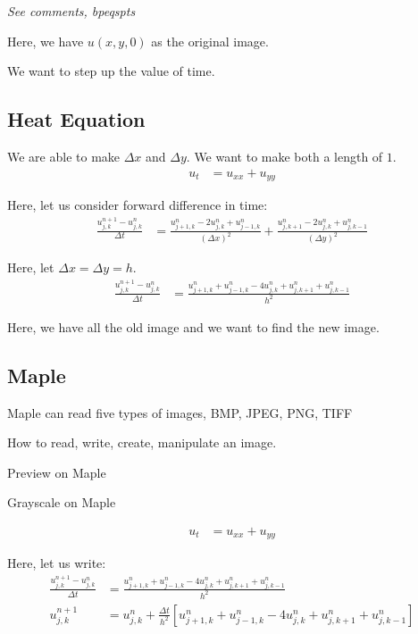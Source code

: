 \emph{See comments, bpeqspts}

Here, we have $u(x, y, 0)$ as the original image.

We want to step up the value of time.


\subsection{Heat Equation}

We are able to make $\Delta x$ and $\Delta y$. We want to make both a length of $1$.
%
\begin{align}
  u_t & = u_{xx} + u_{yy}
\end{align}

Here, let us consider forward difference in time:
%
\begin{align}
  \frac
  {u^{n + 1}_{j, k} - u^n_{j, k}}
  {\Delta t}
  & =
  \frac
  {
  u^n_{j+1, k} - 2u^n_{j, k} + u^n_{j - 1, k}
  }
  {
  (\Delta x)^2
  }
  +
  \frac
  {
  u^n_{j, k+1} - 2u^n_{j, k} + u^n_{j, k - 1}
  }
  {
  (\Delta y)^2
  }
\end{align}

Here, let $\Delta x = \Delta y = h$.
%
\begin{align}
  \frac
  {u^{n + 1}_{j, k} - u^n_{j, k}}
  {\Delta t}
  & = \frac
  {
  u^n_{j+1, k} + u^n_{j-1, k} - 4u^n_{j, k} + u^n_{j, k+1} + u^n_{j, k-1}
  }
  {h^2}
\end{align}

Here, we have all the old image and we want to find the new image.


\subsection{Maple}

Maple can read five types of images, BMP, JPEG, PNG, TIFF

How to read, write, create, manipulate an image.

Preview on Maple

Grayscale on Maple

%
\begin{align}
  u_t & = u_{xx} + u_{yy}
\end{align}

Here, let us write:
%
\begin{align}
  \frac{u^{n + 1}_{j, k} - u^n_{j, k}}{\Delta t}
  & =
  \frac{u^n_{j+1, k} + u^n_{j-1, k} - 4u^n_{j, k} + u^n_{j, k+1} + u^n_{j, k - 1}}{h^2}\\
  u^{n + 1}_{j, k}
  & = u^n_{j, k} + \frac{\Delta t}{h^2}
  \left[
    u^n_{j+1, k} + u^n_{j - 1, k} - 4u^n_{j, k} + u^n_{j, k+1} + u^n_{j, k -1}
  \right]
\end{align}

